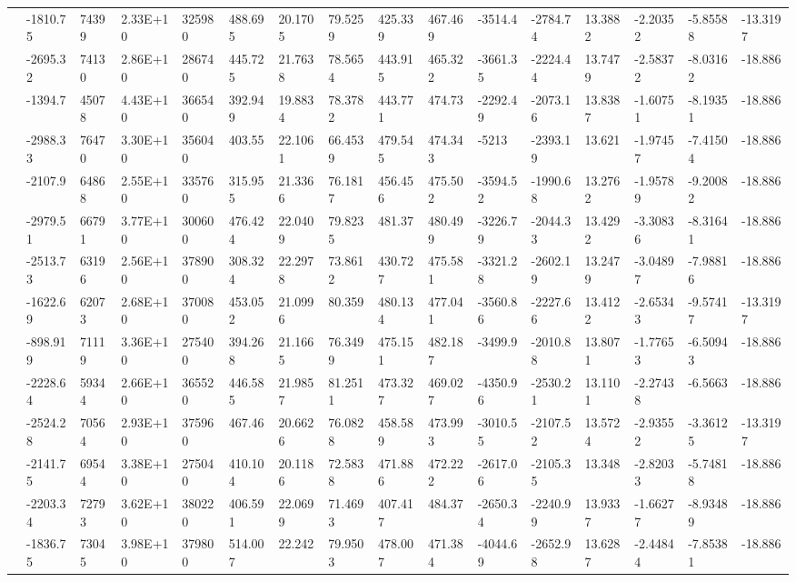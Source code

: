 \documentclass[paper=a4, fontsize=11pt]{scrartcl}
\numberwithin{equation}{section}
\numberwithin{figure}{section}
\numberwithin{table}{section}
\begin{document}
{{\begin{tabular}{l || l | l | l | l | l | l | l | l | l | l | l | l | l | l | l}
    & -1810.75 & 74399 & 2.33E+10 & 325980 & 488.695 & 20.1705 & 79.5259 & 425.339 & 467.469 & -3514.4 & -2784.74 & 13.3882 & -2.20352 & -5.85588 & -13.3197 \\
    & -2695.32 & 74130 & 2.86E+10 & 286740 & 445.725 & 21.7638 & 78.5654 & 443.915 & 465.322 & -3661.35 & -2224.44 & 13.7479 & -2.58372 & -8.03162 & -18.886 \\
    & -1394.7 & 45078 & 4.43E+10 & 366540 & 392.949 & 19.8834 & 78.3782 & 443.771 & 474.73 & -2292.49 & -2073.16 & 13.8387 & -1.60751 & -8.19351 & -18.886 \\
    & -2988.33 & 76470 & 3.30E+10 & 356040 & 403.55 & 22.1061 & 66.4539 & 479.545 & 474.343 & -5213 & -2393.19 & 13.621 & -1.97457 & -7.41504 & -18.886 \\
    & -2107.9 & 64868 & 2.55E+10 & 335760 & 315.955 & 21.3366 & 76.1817 & 456.456 & 475.502 & -3594.52 & -1990.68 & 13.2762 & -1.95789 & -9.20082 & -18.886 \\
    & -2979.51 & 66791 & 3.77E+10 & 300600 & 476.424 & 22.0409 & 79.8235 & 481.37 & 480.499 & -3226.79 & -2044.33 & 13.4292 & -3.30836 & -8.31641 & -18.886 \\
    & -2513.73 & 63196 & 2.56E+10 & 378900 & 308.324 & 22.2978 & 73.8612 & 430.727 & 475.581 & -3321.28 & -2602.19 & 13.2479 & -3.04897 & -7.98816 & -18.886 \\
    & -1622.69 & 62073 & 2.68E+10 & 370080 & 453.052 & 21.0996 & 80.359 & 480.134 & 477.041 & -3560.86 & -2227.66 & 13.4122 & -2.65343 & -9.57417 & -13.3197 \\
    & -898.919 & 71119 & 3.36E+10 & 275400 & 394.268 & 21.1665 & 76.3499 & 475.151 & 482.187 & -3499.9 & -2010.88 & 13.8071 & -1.77653 & -6.50943 & -18.886 \\
    & -2228.64 & 59344 & 2.66E+10 & 365520 & 446.585 & 21.9857 & 81.2511 & 473.327 & 469.027 & -4350.96 & -2530.21 & 13.1101 & -2.27438 & -6.5663 & -18.886 \\
    & -2524.28 & 70564 & 2.93E+10 & 375960 & 467.46 & 20.6626 & 76.0828 & 458.589 & 473.993 & -3010.55 & -2107.52 & 13.5724 & -2.93552 & -3.36125 & -13.3197 \\
    & -2141.75 & 69544 & 3.38E+10 & 275040 & 410.104 & 20.1186 & 72.5838 & 471.886 & 472.222 & -2617.06 & -2105.35 & 13.348 & -2.82033 & -5.74818 & -18.886 \\
    & -2203.34 & 72793 & 3.62E+10 & 380220 & 406.591 & 22.0699 & 71.4693 & 407.417 & 484.37 & -2650.34 & -2240.99 & 13.9337 & -1.66277 & -8.93489 & -18.886 \\
    & -1836.75 & 73045 & 3.98E+10 & 379800 & 514.007 & 22.242 & 79.9503 & 478.007 & 471.384 & -4044.69 & -2652.98 & 13.6287 & -2.44844 & -7.85381 & -18.886 \\

\end{tabular}}}
\end{document}
